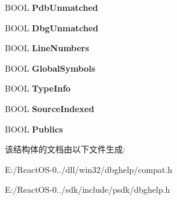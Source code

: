 \begin{DoxyCompactItemize}
\mbox{\label{struct___i_m_a_g_e_h_l_p___m_o_d_u_l_e_w64_ad14916c704a46b9f9163df0b5bbc78fd}} 
B\+O\+OL {\bfseries Pdb\+Unmatched}
\item 
\mbox{\label{struct___i_m_a_g_e_h_l_p___m_o_d_u_l_e_w64_a2d4a670d045b194555fdd3d1b2332636}} 
B\+O\+OL {\bfseries Dbg\+Unmatched}
\item 
\mbox{\label{struct___i_m_a_g_e_h_l_p___m_o_d_u_l_e_w64_ad958b17ecd5cd28d4c4dd27d53ab3416}} 
B\+O\+OL {\bfseries Line\+Numbers}
\item 
\mbox{\label{struct___i_m_a_g_e_h_l_p___m_o_d_u_l_e_w64_a6448729e95a9f8c099792379b1d2172d}} 
B\+O\+OL {\bfseries Global\+Symbols}
\item 
\mbox{\label{struct___i_m_a_g_e_h_l_p___m_o_d_u_l_e_w64_a73e81df072f86f5375ae642765b823fe}} 
B\+O\+OL {\bfseries Type\+Info}
\item 
\mbox{\label{struct___i_m_a_g_e_h_l_p___m_o_d_u_l_e_w64_a51a48ec7b800a1f99b401cfebc3df63e}} 
B\+O\+OL {\bfseries Source\+Indexed}
\item 
\mbox{\label{struct___i_m_a_g_e_h_l_p___m_o_d_u_l_e_w64_a7eed0038fc3929c8f849c96985024207}} 
B\+O\+OL {\bfseries Publics}
\end{DoxyCompactItemize}


该结构体的文档由以下文件生成\+:\begin{DoxyCompactItemize}
\item 
E\+:/\+React\+O\+S-\/0../dll/win32/dbghelp/compat.\+h\item 
E\+:/\+React\+O\+S-\/0../sdk/include/psdk/dbghelp.\+h\end{DoxyCompactItemize}
